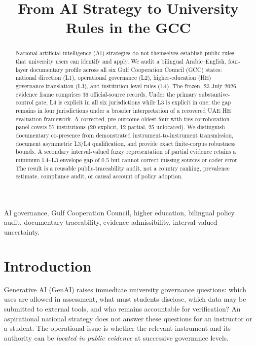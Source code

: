 \documentclass[conference,letterpaper]{IEEEtran}
\begin{document}
\title{From AI Strategy to University Rules in the GCC}
\author{}
\maketitle
\begin{abstract}
National artificial-intelligence (AI) strategies do not themselves establish public rules that university users can identify and apply. We audit a bilingual Arabic--English, four-layer documentary profile across all six Gulf Cooperation Council (GCC) states: national direction (L1), operational governance (L2), higher-education (HE) governance translation (L3), and institution-level rules (L4). The frozen, 23 July 2026 evidence frame comprises 36 official-source records. Under the primary substantive-control gate, L4 is explicit in all six jurisdictions while L3 is explicit in one; the gap remains in four jurisdictions under a broader interpretation of a recovered UAE HE evaluation framework. A corrected, pre-outcome oldest-four-with-ties corroboration panel covers 57 institutions (20 explicit, 12 partial, 25 unlocated). We distinguish documentary co-presence from demonstrated instrument-to-instrument transmission, document asymmetric L3/L4 qualification, and provide exact finite-corpus robustness bounds. A secondary interval-valued fuzzy representation of partial evidence retains a minimum L4--L3 envelope gap of 0.5 but cannot correct missing sources or coder error. The result is a reusable public-traceability audit, not a country ranking, prevalence estimate, compliance audit, or causal account of policy adoption.
\end{abstract}
\begin{IEEEkeywords}
AI governance, Gulf Cooperation Council, higher education, bilingual policy audit, documentary traceability, evidence admissibility, interval-valued uncertainty.
\end{IEEEkeywords}

\section{Introduction}
Generative AI (GenAI) raises immediate university governance questions: which uses are allowed in assessment, what must students disclose, which data may be submitted to external tools, and who remains accountable for verification? An aspirational national strategy does not answer these questions for an instructor or a student. The operational issue is whether the relevant instrument and its authority can be \emph{located in public evidence} at successive governance levels.
\end{document}
